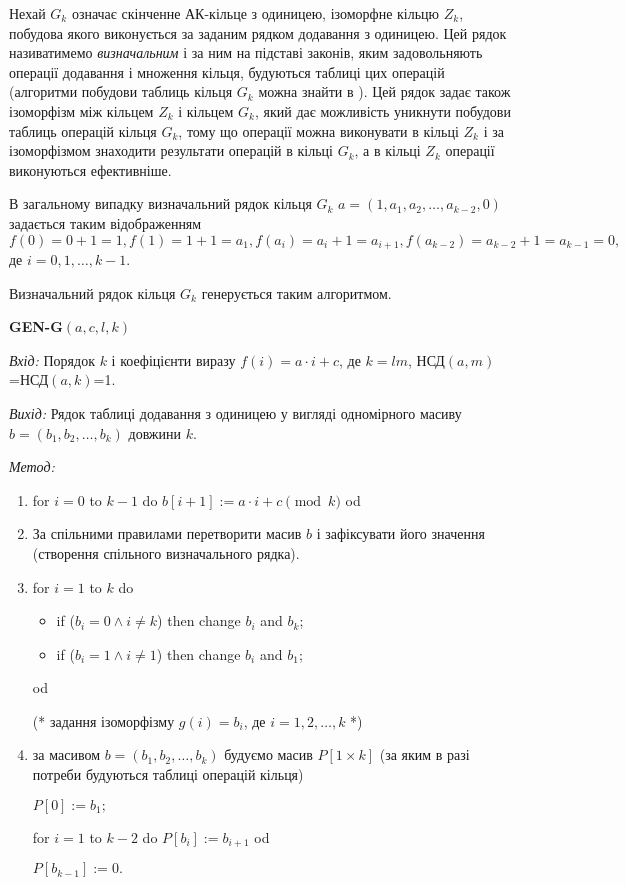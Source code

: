 \documentclass{ceurart}
\begin{document}
Нехай \(G_k\) означає скінченне АК-кільце з одиницею, ізоморфне
кільцю \(Z_k\), побудова якого виконується за заданим рядком додавання
з одиницею. Цей рядок називатимемо {\em визначальним} і за ним на
підставі законів, яким задовольняють операції додавання і множення
кільця, будуються таблиці цих операцій (алгоритми побудови таблиць
кільця \(G_k\) можна знайти в \cite{5}). Цей рядок задає також ізоморфізм
між кільцем \(Z_k\) і кільцем \(G_k\), який дає можливість уникнути
побудови таблиць операцій кільця \(G_k\), тому що операції можна
виконувати в кільці \(Z_k\) і за ізоморфізмом знаходити результати
операцій в кільці \(G_k\), а в кільці \(Z_k\) операції виконуються
ефективніше.

В загальному випадку визначальний рядок кільця \(G_k\)
\(a=(1,a_1,a_2,\ldots,a_{k-2},0)\) задається таким
відображенням \(f(0)=0+1=1, f(1)=1+1=a_1, f(a_i)=a_i+1=a_{i+1},
f(a_{k-2})=a_{k-2}+1=a_{k-1}=0,\) де \(i=0,1,\ldots,k-1\).

Визначальний рядок кільця \(G_k\) генерується таким алгоритмом.

{\footnotesize %
\begin{flushleft} %
\textbf{GEN-G\((a,c,l,k)\)}

{\em Вхід:} Порядок \(k\) і коефіцієнти виразу \(f(i) = a\cdot i + c\),
            де \(k=lm\), НСД\((a,m)\)=НСД\((a,k)\)=1.

{\em Вихід:} Рядок таблиці додавання з одиницею у вигляді одномірного
             масиву \(b=(b_1,b_2,\ldots,b_k)\) довжини \(k\).

{\em Метод:}
\begin{enumerate}
    \item for \(i=0\) to \(k-1\) do \(b[i+1] := a\cdot i + c \pmod{k}\) od
    \item За спільними правилами перетворити масив \(b\) і зафіксувати
          його значення (створення спільного визначального рядка).
    \item for \(i=1\) to \(k\) do
        \begin{itemize}
            \item[] if (\(b_i = 0\land i\not= k\)) then change \(b_i\) and \(b_k\);
            \item[] if (\(b_i = 1 \land i\not= 1\)) then change \(b_i\) and \(b_1\);
        \end{itemize}
          od

          (* задання ізоморфізму \(g(i)=b_i\), де \(i=1,2,\ldots,k\) *)
    \item за масивом \(b=(b_1,b_2,\ldots,b_k)\) будуємо масив
          \(P[1\times k]\) (за яким в разі потреби будуються
          таблиці операцій кільця)

          \(P[0]:=b_1;\)

          for \(i=1\) to \(k-2\) do \(P[b_i]:= b_{i+1}\) od

          \(P[b_{k-1}]:= 0.\)
\end{enumerate}
\end{flushleft}
} %
\end{document}
